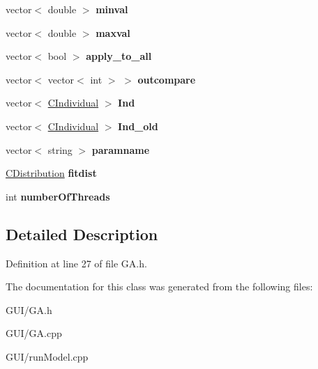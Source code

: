 \begin{DoxyCompactItemize}
vector$<$ double $>$ {\bfseries minval}
\item 
\mbox{\label{class_c_g_a_aa003ec8a4812fee6464fb52bf4819329}} 
vector$<$ double $>$ {\bfseries maxval}
\item 
\mbox{\label{class_c_g_a_afc7cbe08b61b4fafa43650f95d95afb6}} 
vector$<$ bool $>$ {\bfseries apply\+\_\+to\+\_\+all}
\item 
\mbox{\label{class_c_g_a_a9d46c1b65b7e35fbf27a12a84a52f25e}} 
vector$<$ vector$<$ int $>$ $>$ {\bfseries outcompare}
\item 
\mbox{\label{class_c_g_a_af87f79de17535948819eec90e0f9c479}} 
vector$<$ \hyperlink{class_c_individual}{C\+Individual} $>$ {\bfseries Ind}
\item 
\mbox{\label{class_c_g_a_a27aacdd213518564af9c368f49786b72}} 
vector$<$ \hyperlink{class_c_individual}{C\+Individual} $>$ {\bfseries Ind\+\_\+old}
\item 
\mbox{\label{class_c_g_a_ad3e09b9e65abb99b884e0081b1d01a00}} 
vector$<$ string $>$ {\bfseries paramname}
\item 
\mbox{\label{class_c_g_a_a4bb414f2dfc6669fbbe5a52e13ba1909}} 
\hyperlink{class_c_distribution}{C\+Distribution} {\bfseries fitdist}
\item 
\mbox{\label{class_c_g_a_ae682985ca8e92c8812508ff30b620ca4}} 
int {\bfseries number\+Of\+Threads}
\end{DoxyCompactItemize}


\subsection{Detailed Description}


Definition at line 27 of file G\+A.\+h.



The documentation for this class was generated from the following files\+:\begin{DoxyCompactItemize}
\item 
G\+U\+I/G\+A.\+h\item 
G\+U\+I/G\+A.\+cpp\item 
G\+U\+I/run\+Model.\+cpp\end{DoxyCompactItemize}
